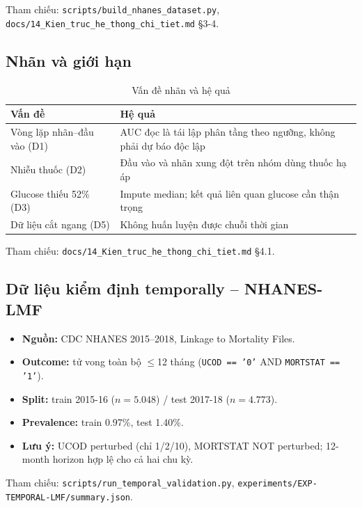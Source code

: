 \documentclass[13pt,a4paper]{article}
\begin{document}
Tham chiếu: \texttt{scripts/build\_nhanes\_dataset.py}, \texttt{docs/14\_Kien\_truc\_he\_thong\_chi\_tiet.md} §3-4.

\subsection{Nhãn và giới hạn}

\begin{table}[H]
\centering
\caption{Vấn đề nhãn và hệ quả}
\label{tab:label_issues}
\begin{tabular}{>{\raggedright\arraybackslash}p{4cm}>{\raggedright\arraybackslash}p{10cm}}
\toprule
Vấn đề & Hệ quả \\
\midrule
Vòng lặp nhãn--đầu vào (D1) & AUC đọc là tái lập phân tầng theo ngưỡng, không phải dự báo độc lập \\
Nhiễu thuốc (D2) & Đầu vào và nhãn xung đột trên nhóm dùng thuốc hạ áp \\
Glucose thiếu 52\% (D3) & Impute median; kết quả liên quan glucose cần thận trọng \\
Dữ liệu cắt ngang (D5) & Không huấn luyện được chuỗi thời gian \\
\bottomrule
\end{tabular}
\end{table}

Tham chiếu: \texttt{docs/14\_Kien\_truc\_he\_thong\_chi\_tiet.md} §4.1.

\subsection{Dữ liệu kiểm định temporally -- NHANES-LMF}

\begin{itemize}
    \item \textbf{Nguồn:} CDC NHANES 2015--2018, Linkage to Mortality Files.
    \item \textbf{Outcome:} tử vong toàn bộ $\le$12 tháng (\texttt{UCOD == '0'} AND \texttt{MORTSTAT == '1'}).
    \item \textbf{Split:} train 2015-16 ($n=5.048$) / test 2017-18 ($n=4.773$).
    \item \textbf{Prevalence:} train 0.97\%, test 1.40\%.
    \item \textbf{Lưu ý:} UCOD perturbed (chỉ 1/2/10), MORTSTAT NOT perturbed; 12-month horizon hợp lệ cho cả hai chu kỳ.
\end{itemize}

Tham chiếu: \texttt{scripts/run\_temporal\_validation.py}, \texttt{experiments/EXP-TEMPORAL-LMF/summary.json}.
\end{document}
